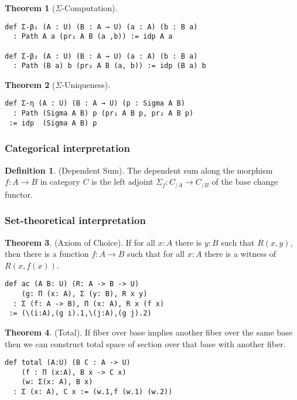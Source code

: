 \documentclass{article}
\theoremstyle{definition}
\newtheorem{definition}{Definition}
\newtheorem{theorem}{Theorem}
\begin{document}
\begin{theorem} [$\Sigma$-Computation]
\begin{lstlisting}[mathescape=true]
def Σ-β₁ (A : U) (B : A → U) (a : A) (b : B a)
  : Path A a (pr₁ A B (a ,b)) := idp A a

def Σ-β₂ (A : U) (B : A → U) (a : A) (b : B a)
  : Path (B a) b (pr₂ A B (a, b)) := idp (B a) b
\end{lstlisting}
\end{theorem}

\begin{theorem} [$\Sigma$-Uniqueness]
\begin{lstlisting}
def Σ-η (A : U) (B : A → U) (p : Sigma A B)
  : Path (Sigma A B) p (pr₁ A B p, pr₂ A B p)
 := idp  (Sigma A B) p
\end{lstlisting}
\end{theorem}

\subsubsection*{Categorical interpretation}

\begin{definition} (Dependent Sum).
The dependent sum along the morphism $f: A \rightarrow B$ in category $C$ is the left
adjoint $\Sigma_f : C_{/A} \rightarrow C_{/B}$ of the base change functor.
\end{definition}

\subsubsection*{Set-theoretical interpretation}

\begin{theorem} (Axiom of Choice).
If for all $x : A$ there is $y : B$ such that $R(x,y)$,
then there is a function $f : A \rightarrow B$
such that for all $x : A$ there is a witness of $R(x,f(x))$.
\begin{lstlisting}
def ac (A B: U) (R: A -> B -> U)
    (g: Π (x: A), Σ (y: B), R x y)
  : Σ (f: A -> B), Π (x: A), R x (f x)
 := (\(i:A),(g i).1,\(j:A),(g j).2)
\end{lstlisting}
\end{theorem}

\begin{theorem} (Total).
If fiber over base implies another fiber
over the same base then we can construct total space of section
over that base with another fiber.
\begin{lstlisting}
def total (A:U) (B C : A -> U)
    (f : Π (x:A), B x -> C x)
    (w: Σ(x: A), B x)
  : Σ (x: A), C x := (w.1,f (w.1) (w.2))
\end{lstlisting}
\end{theorem}
\end{document}
